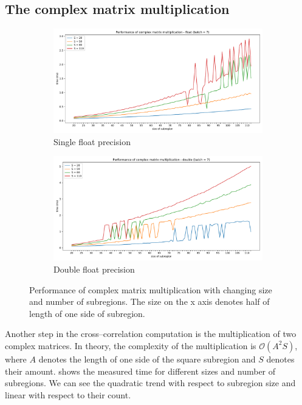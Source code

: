 \subsection{The complex matrix multiplication}
\begin{figure}
	\begin{subfigure}{\textwidth}
		\centering
		\includegraphics[width=\linewidth]{img/eval/multiply-plot-float}
		\caption{Single float precision}
		\label{multiply-plot:float}
	\end{subfigure}%

	\begin{subfigure}{\textwidth}
		\centering
		\includegraphics[width=\linewidth]{img/eval/multiply-plot-double}
		\caption{Double float precision}
		\label{multiply-plot:double}
	\end{subfigure}
	\caption{Performance of complex matrix multiplication with changing size and number of subregions. The size on the x axis denotes half of length of one side of subregion.}
	\label{multiply-plot}
\end{figure}

Another step in the cross--correlation computation is the multiplication of two complex matrices. In theory, the complexity of the multiplication is $\mathcal{O}(A^2S)$, where $A$ denotes the length of one side of the square subregion and $S$ denotes their amount.  shows the measured time for different sizes and number of subregions. We can see the quadratic trend with respect to subregion size and linear with respect to their count.

